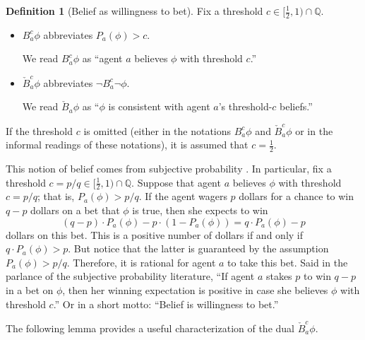 \documentclass[12pt]{article}
\theoremstyle{definition}
\newtheorem{definition}[theorem]{Definition}
\newcommand{\Rat}{\mathbb{Q}}  %
\begin{document}
\begin{definition}[Belief as willingness to bet]
  \label{definition:belief}
  Fix a threshold $c\in[\frac 12,1)\cap\Rat$.
  \begin{itemize}
  \item $B_a^c\phi$ abbreviates $P_a(\phi)>c$.

    We read $B_a^c\phi$ as ``agent $a$ believes $\phi$ with threshold
    $c$.''

  \item $\check B_a^c\phi$ abbreviates $\lnot B_a^c\lnot\phi$.

    We read $\check B_a\phi$ as ``$\phi$ is consistent with agent
    $a$'s threshold-$c$ beliefs.''
  \end{itemize}
  If the threshold $c$ is omitted (either in the notations $B_a^c\phi$
  and $\check B_a^c\phi$ or in the informal readings of these
  notations), it is assumed that $c=\frac 12$.
\end{definition}

This notion of belief comes from subjective probability
\cite{Jeffrey2004:sptrt}. 
In particular, fix a threshold
$c=p/q\in[\frac 12,1)\cap\Rat$.  Suppose that agent $a$ believes $\phi$ with
threshold $c=p/q$; that is, $P_a(\phi)>p/q$.  If the agent wagers $p$
dollars for a chance to win $q-p$ dollars on a bet that $\phi$ is
true, then she expects to win
\[
(q-p)\cdot P_a(\phi) - p\cdot(1-P_a(\phi)) = q\cdot P_a(\phi) - p
\]
dollars on this bet.  This is a positive number of dollars if and only
if $q\cdot P_a(\phi)>p$.  But notice that the latter is guaranteed by
the assumption $P_a(\phi)>p/q$.  Therefore, it is rational for agent
$a$ to take this bet.  Said in the parlance of the subjective
probability literature, ``If agent $a$ stakes $p$ to win $q-p$ in a
bet on $\phi$, then her winning expectation is positive in case she
believes $\phi$ with threshold $c$.''  Or in a short motto: ``Belief
is willingness to bet.''

The following lemma provides a useful characterization of the dual
$\check B^c_a\phi$.
\end{document}
